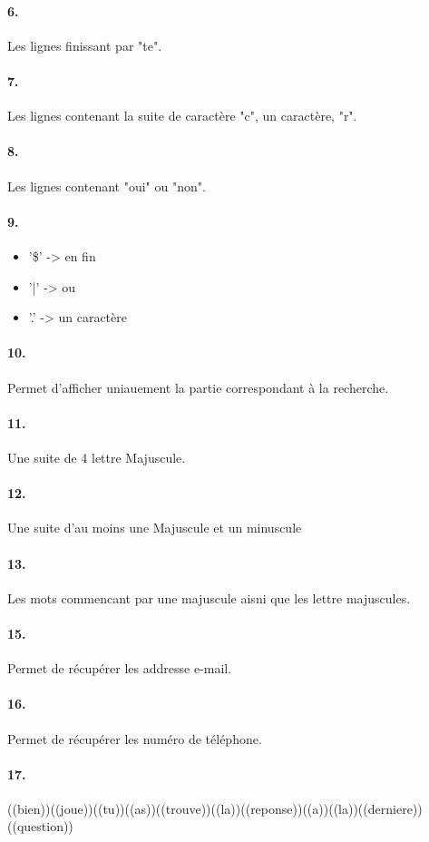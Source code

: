         \paragraph{6.}
            Les lignes finissant par "te".
        \paragraph{7.}
            Les lignes contenant la suite de caractère "c", un caractère, "r".
        \paragraph{8.}
            Les lignes contenant "oui" ou "non".
        \paragraph{9.}
            \begin{itemize}
                \item '\$' -> en fin
                \item '|' -> ou
                \item '.' -> un caractère
            \end{itemize}
        \paragraph{10.}
            Permet d'afficher uniauement la partie correspondant à la recherche.
        \paragraph{11.}
           Une suite de 4 lettre Majuscule.
        \paragraph{12.}
            Une suite d'au moins une Majuscule et un minuscule
        \paragraph{13.}
            Les mots commencant par une majuscule aisni que les lettre majuscules.
        \paragraph{15.}
            Permet de récupérer les addresse e-mail.
        \paragraph{16.}
            Permet de récupérer les numéro de téléphone.
        \paragraph{17.}
            ((bien))((joue))((tu))((as))((trouve))((la))((reponse))((a))((la))((derniere))((question))
